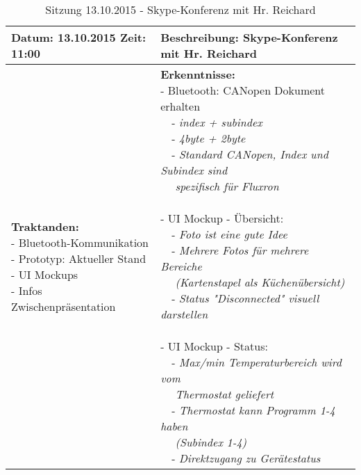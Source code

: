 \begin{table}[H]
\begin{tabularx}{\textwidth}{| l | X |}
\hline
\textbf{Datum:} 13.10.2015
\textbf{Zeit:} 11:00
&
\textbf{Beschreibung:} Skype-Konferenz mit Hr. Reichard \\ \hline
\specialcell[t]{
\textbf{Traktanden:}\\
- Bluetooth-Kommunikation\\
- Prototyp: Aktueller Stand\\
- UI Mockups\\
- Infos Zwischenpräsentation\\
}
& 
\specialcell[t]{
\textbf{Erkenntnisse:}\\
- Bluetooth: CANopen Dokument erhalten\\
~~- \textit{index + subindex}\\
~~- \textit{4byte + 2byte}\\
~~- \textit{Standard CANopen, Index und Subindex sind}\\~~ \textit{spezifisch für Fluxron}\\
\\
- UI Mockup - Übersicht:\\
~~- \textit{Foto ist eine gute Idee}\\
~~- \textit{Mehrere Fotos für mehrere Bereiche}\\~~ \textit{(Kartenstapel als Küchenübersicht)}\\
~~- \textit{Status "Disconnected" visuell darstellen}\\
\\
- UI Mockup - Status:\\
~~- \textit{Max/min Temperaturbereich wird vom}\\~~ \textit{Thermostat geliefert}\\
~~- \textit{Thermostat kann Programm 1-4 haben}\\~~ \textit{(Subindex 1-4)}\\
~~- \textit{Direktzugang zu Gerätestatus}\\
}
\\ \hline
\end{tabularx}
\caption{Sitzung 13.10.2015 - Skype-Konferenz mit Hr. Reichard}
\end{table}



